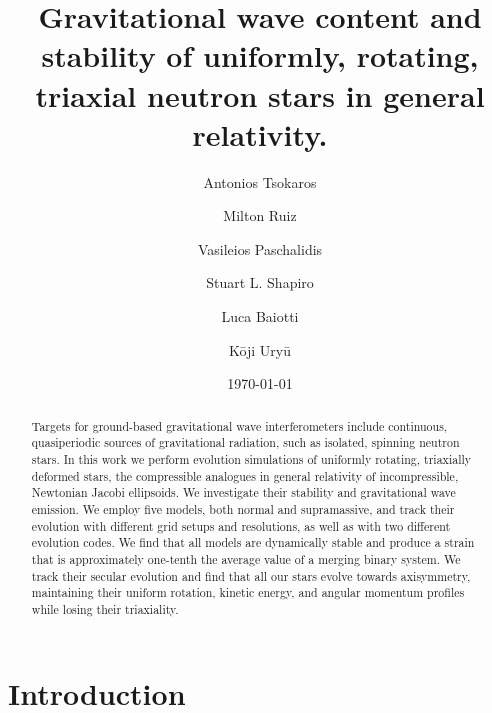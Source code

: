 \documentclass[twocolumn,superscriptaddress,showpacs,prd,aps,amsmath,amssymb,nofootinbib]{revtex4-1}
\begin{document}
\title{Gravitational wave content and stability of uniformly, rotating, triaxial neutron stars
in general relativity.}


\author{Antonios Tsokaros}

\author{Milton Ruiz}
%
\author{Vasileios Paschalidis}
%
\author{Stuart L. Shapiro}
%
\author{Luca Baiotti}
%
\author{K\=oji Ury\=u}


\date{\today}

\begin{abstract}
Targets for ground-based gravitational wave interferometers include continuous, quasiperiodic sources of 
gravitational radiation, such as  
isolated, spinning neutron stars. In this work we perform evolution simulations of uniformly rotating, triaxially 
deformed stars, the compressible analogues in general relativity of incompressible, Newtonian
Jacobi ellipsoids. We  investigate their stability and gravitational wave emission. 
We employ five models, both normal and supramassive, and track their evolution with different grid
setups and resolutions, as well as with two different evolution codes. 
We find that all models are dynamically
stable and produce a strain that is approximately one-tenth the average value of a merging binary system.
We track their secular evolution and find that all our stars evolve towards axisymmetry, maintaining
their uniform rotation, kinetic energy, and angular momentum profiles while losing their triaxiality. 
\end{abstract}

\maketitle


\section{Introduction}
\label{sec:intro}
\end{document}
